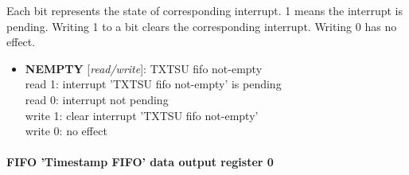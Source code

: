 \vspace{12pt}
Each bit represents the state of corresponding interrupt. 1 means the interrupt is pending. Writing 1 to a bit clears the corresponding interrupt. Writing 0 has no effect.

\vspace{12pt}
\noindent
{}

\begin{itemize}
\item \begin{small}
{\bf 
NEMPTY
} [\emph{read/write}]: TXTSU fifo not-empty
\\
read 1: interrupt 'TXTSU fifo not-empty' is pending\\read 0: interrupt not pending\\write 1: clear interrupt 'TXTSU fifo not-empty'\\write 0: no effect
\end{small}
\end{itemize}
\paragraph*{FIFO 'Timestamp FIFO' data output register 0}\vspace{12pt}


